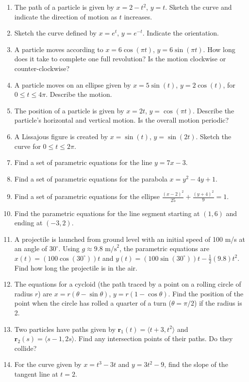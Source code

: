 \documentclass{article}
\begin{document}
\begin{enumerate}
    \item The path of a particle is given by $x=2-t^2$, $y=t$. Sketch the curve and indicate the direction of motion as $t$ increases.
    \item Sketch the curve defined by $x = e^t$, $y = e^{-t}$. Indicate the orientation.
    \item A particle moves according to $x = 6\cos(\pi t)$, $y = 6\sin(\pi t)$. How long does it take to complete one full revolution? Is the motion clockwise or counter-clockwise?
    \item A particle moves on an ellipse given by $x = 5\sin(t)$, $y = 2\cos(t)$, for $0 \le t \le 4\pi$. Describe the motion.
    \item The position of a particle is given by $x = 2t$, $y = \cos(\pi t)$. Describe the particle's horizontal and vertical motion. Is the overall motion periodic?
    \item A Lissajous figure is created by $x = \sin(t)$, $y = \sin(2t)$. Sketch the curve for $0 \le t \le 2\pi$.
    \item Find a set of parametric equations for the line $y = 7x - 3$.
    \item Find a set of parametric equations for the parabola $x = y^2 - 4y + 1$.
    \item Find a set of parametric equations for the ellipse $\frac{(x-2)^2}{25} + \frac{(y+4)^2}{9} = 1$.
    \item Find the parametric equations for the line segment starting at $(1, 6)$ and ending at $(-3, 2)$.
    \item A projectile is launched from ground level with an initial speed of 100 m/s at an angle of $30^\circ$. Using $g \approx 9.8 \text{ m/s}^2$, the parametric equations are $x(t) = (100\cos(30^\circ))t$ and $y(t) = (100\sin(30^\circ))t - \frac{1}{2}(9.8)t^2$. Find how long the projectile is in the air.
    \item The equations for a cycloid (the path traced by a point on a rolling circle of radius $r$) are $x = r(\theta - \sin\theta)$, $y = r(1-\cos\theta)$. Find the position of the point when the circle has rolled a quarter of a turn ($\theta = \pi/2$) if the radius is 2.
    \item Two particles have paths given by $\mathbf{r}_1(t) = \langle t+3, t^2 \rangle$ and $\mathbf{r}_2(s) = \langle s-1, 2s \rangle$. Find any intersection points of their paths. Do they collide?
    \item For the curve given by $x = t^3 - 3t$ and $y = 3t^2 - 9$, find the slope of the tangent line at $t=2$.
\end{enumerate}
\end{document}
